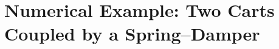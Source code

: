 \documentclass[letterpaper, 10 pt, conference]{ieeeconf}  %
\begin{document}



\section{Numerical Example: Two Carts Coupled by a Spring--Damper}
\label{sec:numerics}
\end{document}
